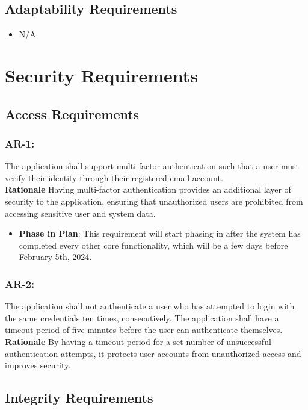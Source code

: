 \documentclass[12pt]{article}
\begin{document}
\subsection{Adaptability Requirements}
\begin{itemize}
    \item N/A
\end{itemize}

\section{Security Requirements}
\subsection{Access Requirements}

\subsubsection*{AR-1:}
The application shall support multi-factor authentication such that a user must verify their identity through their registered email account. \\
\textbf{Rationale} Having multi-factor authentication provides an additional layer of security to the application, ensuring that unauthorized users are prohibited from accessing sensitive user and system data.
 \begin{itemize}
         \item \textbf{Phase in Plan}: This requirement will start phasing in after the system has completed every other core functionality, which will be a few days before February 5th, 2024.
    \end{itemize}


\subsubsection*{AR-2:}
The application shall not authenticate a user who has attempted to login with the same credentials ten times, consecutively. The application shall have a timeout period of five minutes before the user can authenticate themselves. \\
\textbf{Rationale} By having a timeout period for a set number of unsuccessful authentication attempts, it protects user accounts from unauthorized access and improves security.


\subsection{Integrity Requirements}
\end{document}
